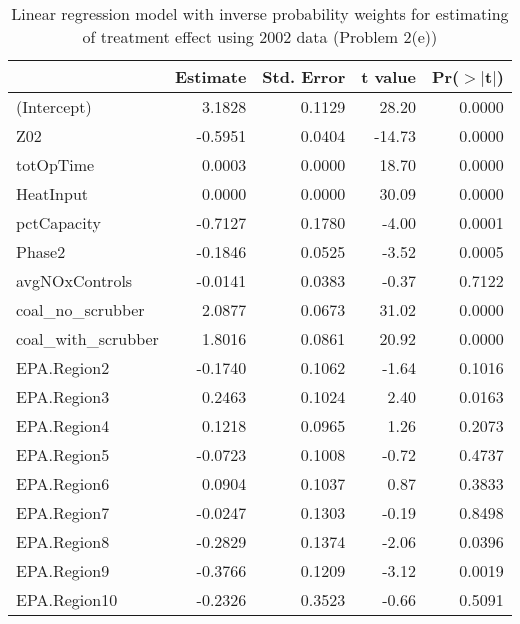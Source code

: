 \begin{table}[ht]
\centering
\begin{tabular}{lrrrr}
  \toprule
 & Estimate & Std. Error & t value & Pr($>$$|$t$|$) \\ 
  \midrule
(Intercept) & 3.1828 & 0.1129 & 28.20 & 0.0000 \\ 
  Z02 & -0.5951 & 0.0404 & -14.73 & 0.0000 \\ 
  totOpTime & 0.0003 & 0.0000 & 18.70 & 0.0000 \\ 
  HeatInput & 0.0000 & 0.0000 & 30.09 & 0.0000 \\ 
  pctCapacity & -0.7127 & 0.1780 & -4.00 & 0.0001 \\ 
  Phase2 & -0.1846 & 0.0525 & -3.52 & 0.0005 \\ 
  avgNOxControls & -0.0141 & 0.0383 & -0.37 & 0.7122 \\ 
  coal\_no\_scrubber & 2.0877 & 0.0673 & 31.02 & 0.0000 \\ 
  coal\_with\_scrubber & 1.8016 & 0.0861 & 20.92 & 0.0000 \\ 
  EPA.Region2 & -0.1740 & 0.1062 & -1.64 & 0.1016 \\ 
  EPA.Region3 & 0.2463 & 0.1024 & 2.40 & 0.0163 \\ 
  EPA.Region4 & 0.1218 & 0.0965 & 1.26 & 0.2073 \\ 
  EPA.Region5 & -0.0723 & 0.1008 & -0.72 & 0.4737 \\ 
  EPA.Region6 & 0.0904 & 0.1037 & 0.87 & 0.3833 \\ 
  EPA.Region7 & -0.0247 & 0.1303 & -0.19 & 0.8498 \\ 
  EPA.Region8 & -0.2829 & 0.1374 & -2.06 & 0.0396 \\ 
  EPA.Region9 & -0.3766 & 0.1209 & -3.12 & 0.0019 \\ 
  EPA.Region10 & -0.2326 & 0.3523 & -0.66 & 0.5091 \\ 
   \bottomrule
\end{tabular}
\caption{Linear regression model with inverse probability weights for estimating of treatment effect using 2002 data (Problem 2(e))} 
\label{tab:lm-2e-02}
\end{table}

